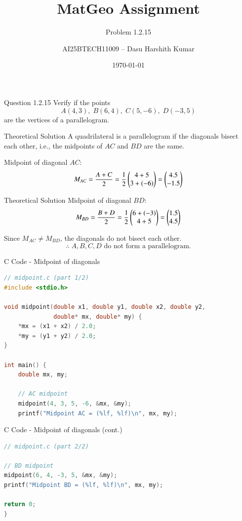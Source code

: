 \documentclass{beamer}
\title{MatGeo Assignment}
\subtitle{Problem 1.2.15}
\author{AI25BTECH11009 -- Dasu Harshith Kumar}
\date{\today}
\begin{document}
\begin{frame}
  \titlepage
\end{frame}

\begin{frame}{Question 1.2.15}
Verify if the points  
\[
A(4,3), \; B(6,4), \; C(5,-6), \; D(-3,5)
\]  
are the vertices of a parallelogram.
\end{frame}

\begin{frame}{Theoretical Solution}
A quadrilateral is a parallelogram if the diagonals bisect each other,
i.e., the midpoints of $AC$ and $BD$ are the same.

Midpoint of diagonal $AC$:
\[
M_{AC}=\frac{A+C}{2}
=\frac{1}{2}\begin{pmatrix}4+5\\3+(-6)\end{pmatrix}
=\begin{pmatrix}4.5\\-1.5\end{pmatrix}
\]
\end{frame}

\begin{frame}{Theoretical Solution}
Midpoint of diagonal $BD$:
\[
M_{BD}=\frac{B+D}{2}
=\frac{1}{2}\begin{pmatrix}6+(-3)\\4+5\end{pmatrix}
=\begin{pmatrix}1.5\\4.5\end{pmatrix}
\]

Since $M_{AC}\neq M_{BD}$, the diagonals do not bisect each other.
\[
\therefore\; A,B, C, D \text{ do not form a parallelogram.}
\]
\end{frame}

\begin{frame}[fragile]{C Code - Midpoint of diagonals}
\begin{lstlisting}[language=C]
// midpoint.c (part 1/2)
#include <stdio.h>

void midpoint(double x1, double y1, double x2, double y2,
              double* mx, double* my) {
    *mx = (x1 + x2) / 2.0;
    *my = (y1 + y2) / 2.0;
}

int main() {
    double mx, my;

    // AC midpoint
    midpoint(4, 3, 5, -6, &mx, &my);
    printf("Midpoint AC = (%lf, %lf)\n", mx, my);
\end{lstlisting}
\end{frame}

\begin{frame}[fragile]{C Code - Midpoint of diagonals (cont.)}
\begin{lstlisting}[language=C]
// midpoint.c (part 2/2)

// BD midpoint
midpoint(6, 4, -3, 5, &mx, &my);
printf("Midpoint BD = (%lf, %lf)\n", mx, my);

return 0;
}
\end{lstlisting}
\end{frame}
\end{document}
